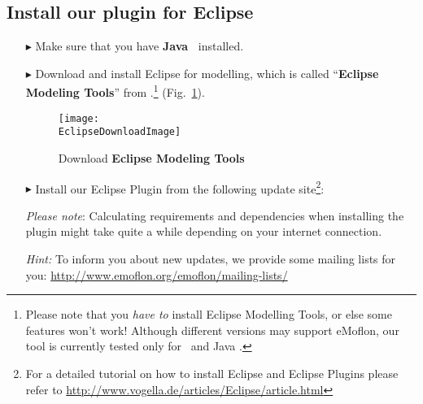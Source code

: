 \genHeader
\hypertarget{installPlugin common}{} 
\subsection{Install our plugin for Eclipse}
 
\vspace{0.5cm}
 
\begin{itemize}

\item[$\blacktriangleright$] Make sure that you have \textbf{Java~\JavaVersion{}} installed.
 
\item[$\blacktriangleright$] Download and install Eclipse \EclipseVersion for modelling, which is called ``\textbf{Eclipse Modeling Tools}'' from \EclipseDownloadLink.\footnote{Please
note that you \emph{have to} install Eclipse Modelling Tools, or else some features won't work! Although different versions may support eMoflon, our tool is
currently tested only for \EclipseVersion~and Java \JavaVersion.} (Fig.~\ref{eclipseDownload}).

\begin{figure}[htbp]
	\centering
  	\texttt{[image: \\EclipseDownloadImage]}
	\caption{Download \textbf{Eclipse Modeling Tools}}
	\label{eclipseDownload}
\end{figure}

\vspace{0.9cm}

\item[$\blacktriangleright$] Install our Eclipse Plugin from the following update site\footnote{For a detailed tutorial on how to install Eclipse and Eclipse
Plugins please refer to \url{http://www.vogella.de/articles/Eclipse/article.html}}: \eMoflonUpdateSite

\emph{Please note}: Calculating requirements and dependencies when
installing the plugin might take quite a while depending on your internet connection.

\emph{Hint:} To inform you about new updates, we provide some mailing lists for you: \url{http://www.emoflon.org/emoflon/mailing-lists/}
\end{itemize}
